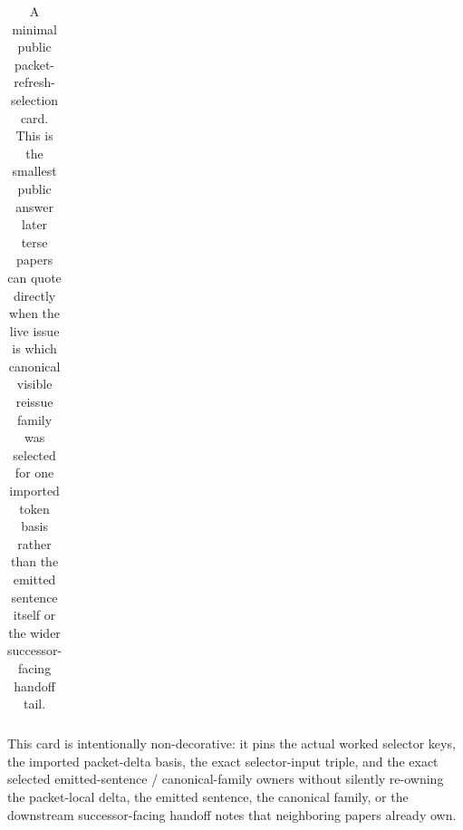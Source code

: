 \documentclass[11pt]{article}
\begin{document}
\begin{table}[t]
\begin{tabularx}{\linewidth}{@{}lX@{}}
\bottomrule
\end{tabularx}
\caption{A minimal public packet-refresh-selection card. This is the smallest public answer later terse papers can quote directly when the live issue is which canonical visible reissue family was selected for one imported token basis rather than the emitted sentence itself or the wider successor-facing handoff tail.}
\label{tab:minimal-public-packet-refresh-selection-card}
\end{table}

This card is intentionally non-decorative: it pins the actual worked selector keys, the imported packet-delta basis, the exact selector-input triple, and the exact selected emitted-sentence / canonical-family owners without silently re-owning the packet-local delta, the emitted sentence, the canonical family, or the downstream successor-facing handoff notes that neighboring papers already own.\cite{series:workedexample}
\end{document}
